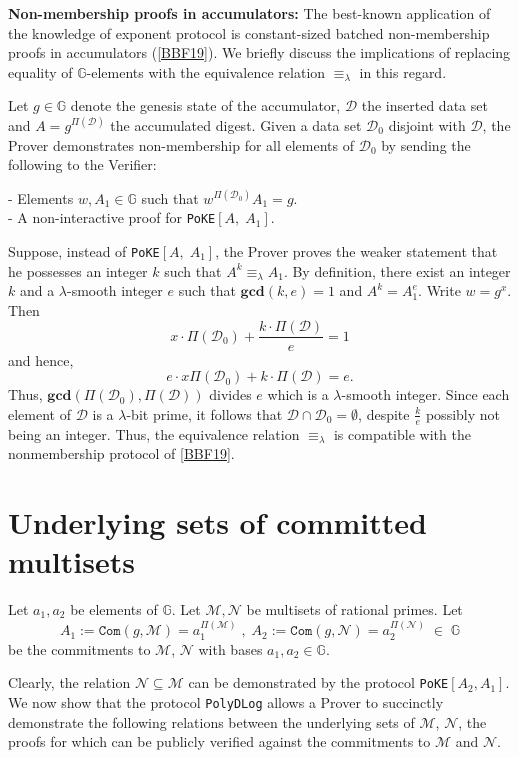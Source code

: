 \documentclass[11pt, lettersize, notitlepage, leqno, footskip=0.6cm]{article}
\newcommand{\ttt}{\texttt}
\newcommand{\bG}{\mathbb{G}}
\newcommand{\eqlam}{\equiv_{\lam}}
\newcommand{\mc}{\mathcal}
\newcommand{\mb}{\mathbb}
\newcommand{\mbf}{\mathbf}
\newcommand{\lam}{\lambda}
\newcommand{\sub}{\subseteq}
\newcommand{\vs}{\vspace{-0.15cm}}
\newcommand{\noin}{\noindent}
\newcommand{\GCD}{\mbf{gcd}}
\numberwithin{equation}{section}
\begin{document}
{{{\noin \textbf{Non-membership proofs in accumulators:} The  best-known application of the knowledge of exponent protocol is constant-sized batched non-membership proofs in accumulators (\hyperlink{BBF19}{[BBF19]}). We briefly discuss the implications of replacing equality of $\mb{G}$-elements with the equivalence relation $\eqlam$ in this regard. 

Let $g \in \mb{G}$ denote the genesis state of the accumulator, $\mc{D}$ the inserted data set and $A = g^{\Pi(\mc{D})}$ the accumulated digest. Given a data set $\mc{D}_0$ disjoint with $\mc{D}$, the Prover demonstrates non-membership for all elements of $\mc{D}_0$ by sending the following to the Verifier:

\noin - Elements $w, A_1\in\mb{G}$ such that $w^{\Pi(\mc{D}_0)}A_1 = g$.\\
- A non-interactive proof for \verb|PoKE|$[A,\; A_1]$.

Suppose, instead of \verb|PoKE|$[A,\; A_1]$, the Prover proves the weaker statement that he possesses an integer $k$ such that $A^k \eqlam A_1$. By definition, there exist an integer $k$ and a $\lam$-smooth integer $e$ such that $\GCD(k,e) = 1$ and $A^{k} = A_1^e$. Write $w = g^x$. Then \vs $$ x\cdot  \Pi(\mc{D}_0) +  \frac{k\cdot\Pi(\mc{D})}{e} = 1 $$ and hence, \vs $$e\cdot x \Pi(\mc{D}_0) +  k\cdot\Pi(\mc{D}) = e .$$ Thus, $\GCD(\Pi(\mc{D}_0), \Pi(\mc{D}))$ divides $e$ which is a $\lam$-smooth integer. Since each element of $\mc{D}$ is a $\lam$-bit prime, it follows that $\mc{D}\cap \mc{D}_0 = \emptyset$, despite $\frac{k}{e}$ possibly not being an integer. Thus, the equivalence relation $\eqlam$ is compatible with the nonmembership protocol of \hyperlink{BBF19}{[BBF19]}.



\section{\fontsize{11}{11}\selectfont Underlying sets of committed multisets}

\noin \hypertarget{Sets}{Let $a_1,a_2$ be elements of $\mb{G}$. Let $\mc{M} , \mc{N}$ be multisets of rational primes.} Let \vs $$A_1:= \ttt{Com}(g, \mc{M}) =  a_1^{\Pi(\mc{M})}\;,\; A_2:= \ttt{Com}(g, \mc{N}) = a_2^{\Pi(\mc{N})}\;\in\;\bG$$ be the commitments to $\mc{M}$, $\mc{N}$ with bases $a_1, a_2\in \bG$.

Clearly, the relation $\mc{N}\sub \mc{M}$ can be demonstrated by the protocol \verb|PoKE|$[A_2, A_1]$. We now show that the protocol \verb|PolyDLog| allows a Prover to succinctly demonstrate the following relations between the underlying sets of $\mc{M}$, $\mc{N}$, the proofs for which can be publicly verified against the commitments to $\mc{M}$ and $\mc{N}$.\vspace{0.1cm}

}}}
\end{document}

